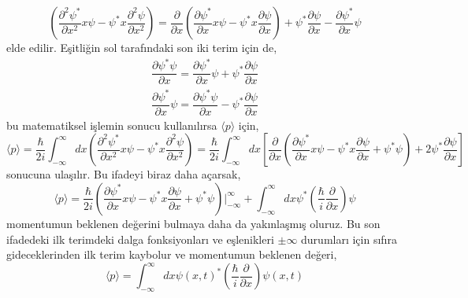 \documentclass[a4paper,12pt, twoside]{article}
\begin{document}
\begin{equation*}
\left( \dfrac {\partial ^{2}\psi ^{\ast }}{\partial x^{2}}x\psi -\psi ^{\ast }x\dfrac {\partial ^{2}\psi }{\partial x^{2}}\right) = \dfrac {\partial }{\partial x}\left( \dfrac {\partial \psi ^{\ast }}{\partial x}x\psi -\psi ^{\ast }x\dfrac {\partial \psi }{\partial x}\right) +\psi ^{\ast }\dfrac {\partial \psi }{\partial x}-\dfrac {\partial \psi ^{\ast }}{\partial x}\psi 
\end{equation*}
elde edilir. Eşitliğin sol tarafındaki son iki terim için de,
\begin{align*}
\dfrac {\partial \psi ^{\ast }\psi }{\partial x}=\dfrac {\partial \psi ^{\ast }}{\partial x}\psi +\psi ^{\ast }\dfrac {\partial \psi }{\partial x}\\
\dfrac {\partial \psi ^{\ast }}{\partial x}\psi =\dfrac {\partial \psi ^{\ast }\psi }{\partial x}-\psi ^{\ast }\dfrac {\partial \psi }{\partial x}
\end{align*}
bu matematiksel işlemin sonucu kullanılırsa $\langle p \rangle$ için,
\begin{equation*}
\langle p\rangle =\dfrac {\hbar }{2i}\int ^{\infty }_{-\infty }dx\left( \dfrac {\partial ^{2}\psi ^{\ast }}{\partial x^{2}}x\psi -\psi ^{\ast }x\dfrac {\partial ^{2}\psi }{\partial x^{2}}\right) =  \dfrac {\hbar }{2i}\int ^{\infty }_{-\infty }dx \left[\dfrac {\partial }{\partial x}\left( \dfrac {\partial \psi ^{\ast }}{\partial x}x\psi -\psi ^{\ast }x\dfrac {\partial \psi }{\partial x} + \psi^\ast \psi\right) +2\psi ^{\ast }\dfrac {\partial \psi }{\partial x}\right]
\end{equation*}
sonucuna ulaşılır. Bu ifadeyi biraz daha açarsak,
\begin{equation*}
\langle p\rangle = \dfrac {\hbar }{2i}\left( \dfrac {\partial \psi ^{\ast }}{\partial x}x\psi -\psi ^{\ast }x\dfrac {\partial \psi }{\partial x} + \psi^\ast \psi \right){\bigg |}_{-\infty}^{\infty} + \int ^{\infty }_{-\infty }dx \psi ^{\ast }\left(\dfrac {\hbar }{i}\dfrac {\partial}{\partial x}\right) \psi
\end{equation*}
momentumun beklenen değerini bulmaya daha da yakınlaşmış oluruz. Bu son ifadedeki ilk terimdeki dalga fonksiyonları ve eşlenikleri $\pm\infty$ durumları için sıfıra gideceklerinden ilk terim kaybolur ve momentumun beklenen değeri,
\begin{equation}
\langle p\rangle =  \int ^{\infty }_{-\infty }dx \psi(x,t) ^{\ast }\left(\dfrac {\hbar }{i}\dfrac {\partial}{\partial x}\right) \psi(x,t)
\label{eq:expactation_value_and_op_momentum}
\end{equation}
\end{document}
